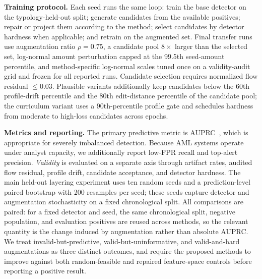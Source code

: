 \documentclass[sigconf,review,anonymous]{acmart}
\begin{document}
\textbf{Training protocol.}
Each seed runs the same loop: train the base detector on the typology-held-out
split; generate candidates from the available positives; repair or project them
according to the method; select candidates by detector hardness when
applicable; and retrain on the augmented set. Final transfer runs use
augmentation ratio $\rho{=}0.75$, a candidate pool $8{\times}$ larger than the
selected set, log-normal amount perturbation capped at the 99.5th seed-amount
percentile, and method-specific log-normal scales tuned once on a
validity-audit grid and frozen for all reported runs. Candidate selection
requires normalized flow residual $\leq 0.03$. Plausible variants additionally
keep candidates below the 60th profile-drift percentile and the 80th
edit-distance percentile of the candidate pool; the curriculum variant uses a
90th-percentile profile gate and schedules hardness from moderate to high-loss
candidates across epochs.

\textbf{Metrics and reporting.}
The primary predictive metric is AUPRC~\cite{davis2006relationship}, which is
appropriate for severely imbalanced detection. Because AML systems operate
under analyst capacity, we additionally report low-FPR recall and top-alert
precision. \emph{Validity} is evaluated on a separate axis through artifact
rates, audited flow residual, profile drift, candidate acceptance, and
detector hardness. The main held-out layering experiment uses ten random
seeds and a prediction-level paired bootstrap with 200 resamples per seed;
these seeds capture detector and augmentation stochasticity on a fixed
chronological split. All comparisons are paired: for a fixed detector and seed,
the same chronological split, negative population, and evaluation positives are
reused across methods, so the relevant quantity is the change induced by
augmentation rather than absolute AUPRC. We treat invalid-but-predictive,
valid-but-uninformative, and valid-and-hard augmentations as three distinct
outcomes, and require the proposed methods to improve against both
random-feasible and repaired feature-space controls before reporting a
positive result.
\end{document}
